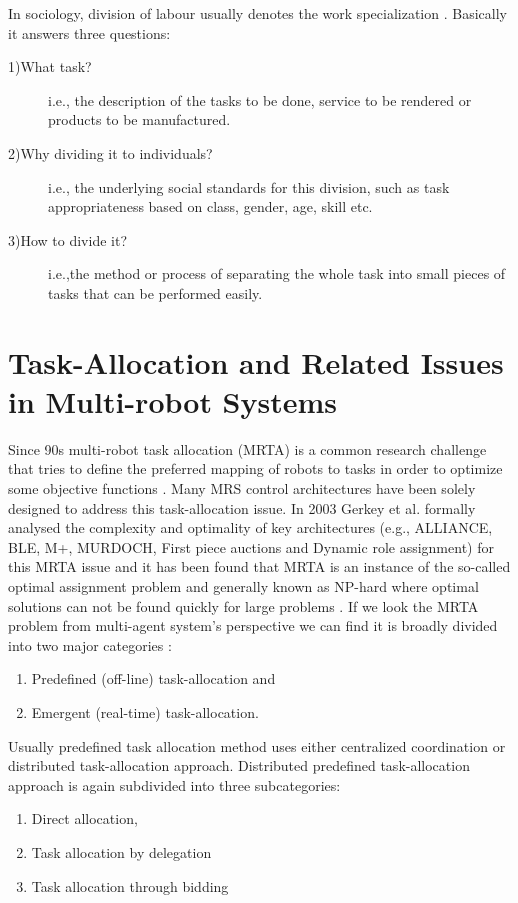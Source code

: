 In sociology, division of labour usually denotes the work specialization \cite{Sayer+1992}. Basically it answers three questions:
\begin{description}
\item[1)What task?] i.e., the description of the tasks to be done, service to be rendered or products to be manufactured.
\item[2)Why dividing it to individuals?] i.e., the underlying social standards for this division, such as task appropriateness based on class, gender, age, skill etc.
\item[3)How to divide it?] i.e.,the method or process of separating the whole task into small pieces of tasks that can be performed easily. 
\end{description}
 

\section{Task-Allocation and Related Issues in Multi-robot Systems}
Since 90s multi-robot task allocation (MRTA) is a common research challenge that tries to define the preferred mapping of robots to tasks in order to optimize some objective functions  \cite{Gerkey+2004}. Many MRS control architectures have been solely designed to address this task-allocation issue. In 2003 Gerkey et al. formally analysed the complexity and optimality of key architectures (e.g., ALLIANCE, BLE, M+, MURDOCH, First piece auctions and Dynamic role assignment) for this MRTA issue and it has been found that MRTA is an instance of the so-called optimal assignment problem \cite{Gerkey+2003} and generally known as NP-hard where optimal solutions can not be found quickly for large problems \cite{Gerkey+2004}. 
If we look the MRTA problem from multi-agent system's perspective we can find it is broadly divided into two major categories \cite{Shen+2001}: 
\begin{enumerate}
\item Predefined (off-line) task-allocation and 
\item Emergent (real-time) task-allocation. 
\end{enumerate}
Usually predefined task allocation method uses either centralized coordination or distributed task-allocation approach. Distributed predefined task-allocation approach is again subdivided into three subcategories: 
\begin{enumerate}
\item Direct allocation, 
\item Task allocation by delegation 
\item Task allocation through bidding
\end{enumerate}
